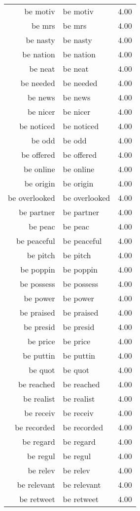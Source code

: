 \begin{table}[ht]
\begin{tabular}{rlr}
  be motiv & be motiv & 4.00 \\ 
  be mrs & be mrs & 4.00 \\ 
  be nasty & be nasty & 4.00 \\ 
  be nation & be nation & 4.00 \\ 
  be neat & be neat & 4.00 \\ 
  be needed & be needed & 4.00 \\ 
  be news & be news & 4.00 \\ 
  be nicer & be nicer & 4.00 \\ 
  be noticed & be noticed & 4.00 \\ 
  be odd & be odd & 4.00 \\ 
  be offered & be offered & 4.00 \\ 
  be online & be online & 4.00 \\ 
  be origin & be origin & 4.00 \\ 
  be overlooked & be overlooked & 4.00 \\ 
  be partner & be partner & 4.00 \\ 
  be peac & be peac & 4.00 \\ 
  be peaceful & be peaceful & 4.00 \\ 
  be pitch & be pitch & 4.00 \\ 
  be poppin & be poppin & 4.00 \\ 
  be possess & be possess & 4.00 \\ 
  be power & be power & 4.00 \\ 
  be praised & be praised & 4.00 \\ 
  be presid & be presid & 4.00 \\ 
  be price & be price & 4.00 \\ 
  be puttin & be puttin & 4.00 \\ 
  be quot & be quot & 4.00 \\ 
  be reached & be reached & 4.00 \\ 
  be realist & be realist & 4.00 \\ 
  be receiv & be receiv & 4.00 \\ 
  be recorded & be recorded & 4.00 \\ 
  be regard & be regard & 4.00 \\ 
  be regul & be regul & 4.00 \\ 
  be relev & be relev & 4.00 \\ 
  be relevant & be relevant & 4.00 \\ 
  be retweet & be retweet & 4.00 \\ 

\end{tabular}
\end{table}
